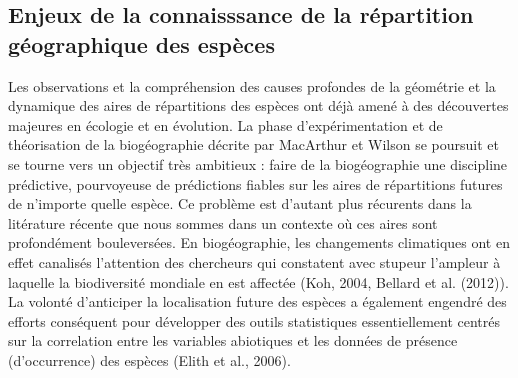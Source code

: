 \subsection*{Enjeux de la connaisssance de la répartition géographique
des
espèces}\label{enjeux-de-la-connaisssance-de-la-ruxe9partition-guxe9ographique-des-espuxe8ces}

Les observations et la compréhension des causes profondes de la
géométrie et la dynamique des aires de répartitions des espèces ont déjà
amené à des découvertes majeures en écologie et en évolution. La phase
d'expérimentation et de théorisation de la biogéographie décrite par
MacArthur et Wilson se poursuit et se tourne vers un objectif très
ambitieux : faire de la biogéographie une discipline prédictive,
pourvoyeuse de prédictions fiables sur les aires de répartitions futures
de n'importe quelle espèce. Ce problème est d'autant plus récurents dans
la litérature récente que nous sommes dans un contexte où ces aires sont
profondément bouleversées. En biogéographie, les changements climatiques
ont en effet canalisés l'attention des chercheurs qui constatent avec
stupeur l'ampleur à laquelle la biodiversité mondiale en est affectée
(Koh, 2004, Bellard et al. (2012)). La volonté d'anticiper la
localisation future des espèces a également engendré des efforts
conséquent pour développer des outils statistiques essentiellement
centrés sur la correlation entre les variables abiotiques et les données
de présence (d'occurrence) des espèces (Elith et al., 2006).

